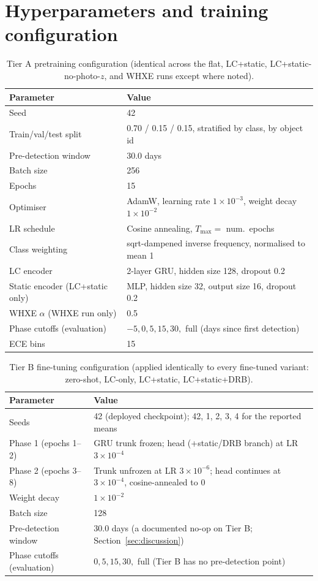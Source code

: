 \chapter{Hyperparameters and training configuration}
\label{sec:appendixa}

\begin{table}[htb]
\centering
\caption{Tier A pretraining configuration (identical across the flat,
LC+static, LC+static-no-photo-$z$, and WHXE runs except where noted).}
\begin{tabular}{L{5.2cm}L{8.3cm}}
\toprule
Parameter & Value \\
\midrule
Seed & 42 \\
Train/val/test split & 0.70 / 0.15 / 0.15, stratified by class, by object id \\
Pre-detection window & 30.0 days \\
Batch size & 256 \\
Epochs & 15 \\
Optimiser & AdamW, learning rate $1\times10^{-3}$, weight decay $1\times10^{-2}$ \\
LR schedule & Cosine annealing, $T_\mathrm{max}=$ num.\ epochs \\
Class weighting & sqrt-dampened inverse frequency, normalised to mean 1 \\
LC encoder & 2-layer GRU, hidden size 128, dropout 0.2 \\
Static encoder (LC+static only) & MLP, hidden size 32, output size 16, dropout 0.2 \\
WHXE $\alpha$ (WHXE run only) & 0.5 \\
Phase cutoffs (evaluation) & $-5, 0, 5, 15, 30,$ full (days since first detection) \\
ECE bins & 15 \\
\bottomrule
\end{tabular}
\end{table}

\begin{table}[htb]
\centering
\caption{Tier B fine-tuning configuration (applied identically to every
fine-tuned variant: zero-shot, LC-only, LC+static, LC+static+DRB).}
\begin{tabular}{L{5.2cm}L{8.3cm}}
\toprule
Parameter & Value \\
\midrule
Seeds & 42 (deployed checkpoint); 42, 1, 2, 3, 4 for the reported means \\
Phase 1 (epochs 1--2) & GRU trunk frozen; head (+static/DRB branch) at LR $3\times10^{-4}$ \\
Phase 2 (epochs 3--8) & Trunk unfrozen at LR $3\times10^{-6}$; head continues at $3\times10^{-4}$, cosine-annealed to 0 \\
Weight decay & $1\times10^{-2}$ \\
Batch size & 128 \\
Pre-detection window & 30.0 days (a documented no-op on Tier B; Section~\ref{sec:discussion}) \\
Phase cutoffs (evaluation) & $0, 5, 15, 30,$ full (Tier B has no pre-detection point) \\
\bottomrule
\end{tabular}
\end{table}

